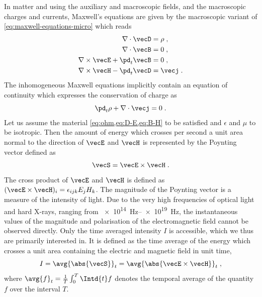 \documentclass[
twoside,
openright,
titlepage,
numbers=noenddot,
headinclude,
fleqn,
a4paper,
footinclude=true,
cleardoublepage=empty,
abstractoff,
BCOR=5mm,
paper=a4,
fontsize=11pt,
british,ngerman,american,
]{scrreprt}
\begin{document}
In matter and using the auxiliary and macroscopic fields, and the
macroscopic charges and currents, Maxwell's equations are given by the
macroscopic variant of \cref{eq:maxwell-equations-micro} which reads
\cite{BornWolf,Jackson}
\begin{equation}
  \label{eq:maxwell-equations-macro}
  \begin{split}
    \nabla\cdot\vecD &= \rho\;,\\
    \nabla\cdot\vecB &= 0\;,\\
    \nabla \times \vecE +\pd_t\vecB &= 0\;,\\
    \nabla \times \vecH -\pd_t\vecD &= \vecj\;.
  \end{split}
\end{equation}
The inhomogeneous Maxwell equations implicitly contain an equation of
continuity which expresses the conservation of charge as
\begin{equation}
  \label{eq:continuity}
  \pd_t{\rho}+\nabla\cdot\vecj = 0\;.
\end{equation}
Let us assume the material \cref{eq:ohm,eq:D-E,eq:B-H} to be satisfied
and $\epsilon$ and $\mu$ to be isotropic.  Then the amount of energy
which crosses per second a unit area normal to the direction of
$\vecE$ and $\vecH$ is represented by the Poynting vector defined as
\begin{equation}
  \label{eq:poynting-vector}
  \vecS = \vecE\times\vecH \;.
\end{equation}
The cross product of $\vecE$ and $\vecH$ is defined as
$(\vecE\times\vecH)_i=\epsilon_{i j k}E_j H_k$.  The magnitude of the
Poynting vector is a measure of the intensity of light.  Due to the
very high frequencies of optical light and hard X-rays, ranging from
\SIrange{e14}{e19}{Hz}, the instantaneous values of the magnitude and
polarisation of the electromagnetic field cannot be observed directly.
Only the time averaged intensity $I$ is accessible, which we thus are
primarily interested in.  It is defined as the time average of the
energy which crosses a unit area containing the electric and magnetic
field in unit time,
\begin{equation}
  \label{eq:intensity-fields}
  I = \avg{\abs{\vecS}}_t = \avg{\abs{\vecE\times\vecH}}_t\;,
\end{equation}
where $\avg{f}_t=\frac{1}{T}\int_{0}^T\Intd{t}f$ denotes the temporal
average of the quantity $f$ over the interval $T$.
\end{document}
